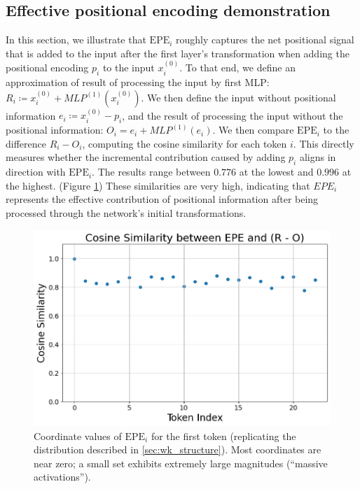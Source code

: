 \documentclass[11pt]{article}
\begin{document}
\subsection{Effective positional encoding demonstration} \label{app:epe_exp}
In this section, we illustrate that $\mathrm{EPE}_i$ roughly captures the net positional signal that is added to the input after the first layer’s transformation when adding the positional encoding $p_i$ to the input $x_i^{(0)}$. To that end, we define an approximation of result of processing the input by first MLP: $R_i \coloneq x_i^{(0)} + MLP^{(1)}(x_i^{(0)})$. We then define the input without positional information $e_i \coloneq x_i^{(0)}-p_i$, and the result of processing the input without the positional information: $O_i=e_i + MLP^{(1)}(e_i)$.  We then compare \(\mathrm{EPE}_i\) to the difference \(R_i - O_i\), computing the cosine similarity for each token \(i\). This directly measures whether the incremental contribution caused by adding \(p_i\) aligns in direction with \(\mathrm{EPE}_i\). The results range between $0.776$ at the lowest and $0.996$ at the highest. (Figure \ref{fig:epe_exp}) These similarities are very high, indicating that $EPE_i$ represents the effective contribution of positional information after being processed through the network’s initial transformations.

\begin{figure}[t]
  \includegraphics[width=\columnwidth]{figures/epe_exp.png}
  \caption{Coordinate values of $\mathrm{EPE}_i$ for the first token (replicating the distribution described in \cref{sec:wk_structure}). Most coordinates are near zero; a small set exhibits extremely large magnitudes (``massive activations'').}
  \label{fig:epe_exp}
\end{figure}
\end{document}
